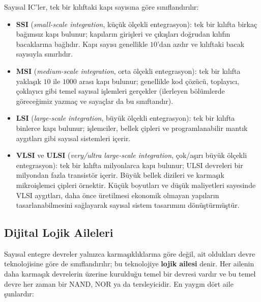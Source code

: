 Sayısal IC'ler, tek bir kılıftaki kapı sayısına göre sınıflandırılır:

\begin{itemize}[nosep]
    \item \textbf{SSI} (\emph{small-scale integration}, küçük ölçekli entegrasyon):
    tek bir kılıfta birkaç bağımsız kapı bulunur; kapıların girişleri ve çıkışları
    doğrudan kılıfın bacaklarına bağlıdır. Kapı sayısı genellikle $10$'dan azdır ve
    kılıftaki bacak sayısıyla sınırlıdır.
    \item \textbf{MSI} (\emph{medium-scale integration}, orta ölçekli entegrasyon):
    tek bir kılıfta yaklaşık $10$ ile $1000$ arası kapı bulunur; genellikle kod
    çözücü, toplayıcı, çoklayıcı gibi temel sayısal işlemleri gerçekler (ilerleyen
    bölümlerde göreceğimiz yazmaç ve sayaçlar da bu sınıftandır).
    \item \textbf{LSI} (\emph{large-scale integration}, büyük ölçekli entegrasyon):
    tek bir kılıfta binlerce kapı bulunur; işlemciler, bellek çipleri ve
    programlanabilir mantık aygıtları gibi sayısal sistemleri içerir.
    \item \textbf{VLSI} ve \textbf{ULSI} (\emph{very/ultra large-scale integration},
    çok/aşırı büyük ölçekli entegrasyon): tek bir kılıfta milyonlarca kapı bulunur;
    ULSI devreleri bir milyondan fazla transistör içerir. Büyük bellek dizileri ve
    karmaşık mikroişlemci çipleri örnektir. Küçük boyutları ve düşük maliyetleri
    sayesinde VLSI aygıtları, daha önce üretilmesi ekonomik olmayan yapıların
    tasarlanabilmesini sağlayarak sayısal sistem tasarımını dönüştürmüştür.
\end{itemize}

\subsection{Dijital Lojik Aileleri}
\label{sec:dijital-lojik-aileleri}

Sayısal entegre devreler yalnızca karmaşıklıklarına göre değil, ait oldukları devre
teknolojisine göre de sınıflandırılır; bu teknolojiye \textbf{lojik ailesi} denir. Her
ailenin daha karmaşık devrelerin üzerine kurulduğu temel bir devresi vardır ve bu temel
devre her zaman bir NAND, NOR ya da tersleyicidir. En yaygın dört aile şunlardır:

